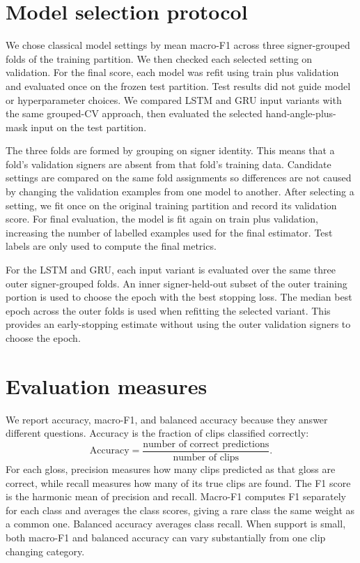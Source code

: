 \documentclass[12pt,a4paper,oneside]{report}
\begin{document}
\section{Model selection protocol}
We chose classical model settings by mean macro-F1 across three signer-grouped folds of the training partition. We then checked each selected setting on validation. For the final score, each model was refit using train plus validation and evaluated once on the frozen test partition. Test results did not guide model or hyperparameter choices. We compared LSTM and GRU input variants with the same grouped-CV approach, then evaluated the selected hand-angle-plus-mask input on the test partition.

The three folds are formed by grouping on signer identity. This means that a fold's validation signers are absent from that fold's training data. Candidate settings are compared on the same fold assignments so differences are not caused by changing the validation examples from one model to another. After selecting a setting, we fit once on the original training partition and record its validation score. For final evaluation, the model is fit again on train plus validation, increasing the number of labelled examples used for the final estimator. Test labels are only used to compute the final metrics.

For the LSTM and GRU, each input variant is evaluated over the same three outer signer-grouped folds. An inner signer-held-out subset of the outer training portion is used to choose the epoch with the best stopping loss. The median best epoch across the outer folds is used when refitting the selected variant. This provides an early-stopping estimate without using the outer validation signers to choose the epoch.

\section{Evaluation measures}
We report accuracy, macro-F1, and balanced accuracy because they answer different questions. Accuracy is the fraction of clips classified correctly:
\[
\mathrm{Accuracy}=\frac{\text{number of correct predictions}}{\text{number of clips}}.
\]
For each gloss, precision measures how many clips predicted as that gloss are correct, while recall measures how many of its true clips are found. The F1 score is the harmonic mean of precision and recall. Macro-F1 computes F1 separately for each class and averages the class scores, giving a rare class the same weight as a common one. Balanced accuracy averages class recall. When support is small, both macro-F1 and balanced accuracy can vary substantially from one clip changing category.
\end{document}
